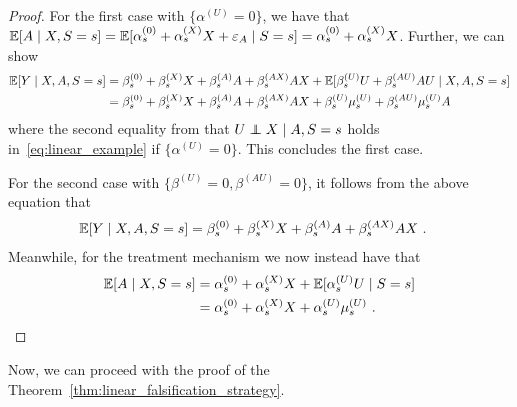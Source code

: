 \documentclass{article}
\begin{document}
\begin{proof}
    For the first case with $\{\alpha^{(U)} = 0\}$, we have that $\mathbb{E}[A\mid X, S=s]=\mathbb{E}[\alpha_{s}^{(0)} + \alpha_{s}^{(X)}  X + \varepsilon_A\mid S=s]= \alpha_{s}^{(0)} + \alpha_{s}^{(X)}  X$. Further, we can show
    \begin{align*}
    \mathbb{E}[Y\mid X, A, S=s] & = \beta_{s}^{(0)} + \beta_{s}^{(X)} X + \beta_{s}^{(A)} A + \beta_{s}^{(AX)} AX + \mathbb{E}[\beta_{s}^{(U)} U + \beta_{s}^{(AU)} A U \mid X,A,S=s] \\
    & = \beta_{s}^{(0)} + \beta_{s}^{(X)} X + \beta_{s}^{(A)} A + \beta_{s}^{(AX)} AX + \beta_{s}^{(U)} \mu_s^{(U)} + \beta_{s}^{(AU)}  \mu_s^{(U)} A
    \end{align*}
    where the second equality from that $U\indep X\mid A, S=s$ holds in~\eqref{eq:linear_example} if $\{\alpha^{(U)} = 0\}$. This concludes the first case.

    For the second case with $\{\beta^{(U)}=0, \beta^{(AU)}=0\}$, it follows from the above equation that  
    \begin{align*}
    \mathbb{E}[Y\mid X, A, S=s] & = \beta_{s}^{(0)} + \beta_{s}^{(X)} X + \beta_{s}^{(A)} A + \beta_{s}^{(AX)} AX~.
    \end{align*}
    Meanwhile, for the treatment mechanism we now instead have that
    \begin{align*}
        \mathbb{E}[A\mid X, S=s] & = \alpha_{s}^{(0)} + \alpha_{s}^{(X)} X + \mathbb{E}[\alpha_{s}^{(U)} U \mid S=s] \\
        & =  \alpha_{s}^{(0)} + \alpha_{s}^{(X)} X + \alpha_{s}^{(U)} \mu_s^{(U)}~.
    \end{align*}
\end{proof}
Now, we can proceed with the proof of the Theorem~\ref{thm:linear_falsification_strategy}.
\end{document}

